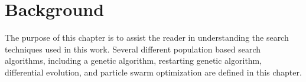 \chapter{Background}

The purpose of this chapter is to assist the reader in understanding the search techniques used in this work. Several different population based search algorithms, including a genetic algorithm, restarting genetic algorithm, differential evolution, and particle swarm optimization are defined in this chapter.


% 



% 
